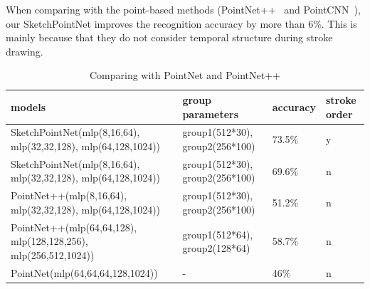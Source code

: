 When comparing with the point-based methods (PointNet++~\cite{qi2017pointnetplusplus} and PointCNN~\cite{1801.07791}), our SketchPointNet improves the recognition accuracy by more than $6\%$. 
This is mainly because that they do not consider temporal structure during stroke drawing. 

\begin{table}
\centering
\begin{tabular}{llll}
    \hline
     models&group parameters& accuracy& stroke order\\
    \hline
     SketchPointNet(mlp(8,16,64), mlp(32,32,128), mlp(64,128,1024))&group1(512*30), group2(256*100)& 73.5\% & y\\
    \hline
     SketchPointNet(mlp(8,16,64), mlp(32,32,128), mlp(64,128,1024))&group1(512*30), group2(256*100)& 69.6\% & n\\
    \hline
     PointNet++(mlp(8,16,64), mlp(32,32,128), mlp(64,128,1024))&group1(512*30), group2(256*100)& 51.2\% &n\\
    \hline
     PointNet++(mlp(64,64,128), mlp(128,128,256), mlp(256,512,1024))&group1(512*64), group2(128*64)& 58.7\% &n\\
    \hline
     PointNet(mlp(64,64,64,128,1024))&-& 46\% &n\\
    \hline
\end{tabular}
\caption{Comparing with PointNet and PointNet++}
\label{tbl:pointnet_cp}
\end{table}

